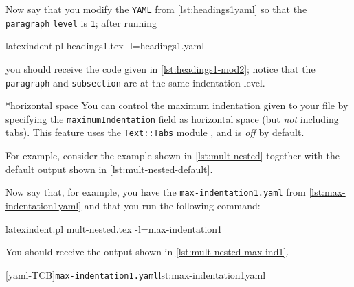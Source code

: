  Now say that you modify the \texttt{YAML} from \cref{lst:headings1yaml} so that the
 \texttt{paragraph} \texttt{level} is \texttt{1}; after running 

 \begin{commandshell}
latexindent.pl headings1.tex -l=headings1.yaml
\end{commandshell}

 you should receive the code given in \cref{lst:headings1-mod2}; notice that the
 \texttt{paragraph} and \texttt{subsection} are at the same indentation level.


*{horizontal space}
 You can control the maximum indentation given to your file by
  specifying the \texttt{maximumIndentation}
 field as horizontal space (but \emph{not} including tabs). This feature uses the
 \texttt{Text::Tabs} module \cite{texttabs}, and is \emph{off} by default.%

 \begin{example}
 For example, consider the example shown in \cref{lst:mult-nested} together with the
 default output shown in \cref{lst:mult-nested-default}.

 \begin{cmhtcbraster}[raster column skip=.1\linewidth]
 \end{cmhtcbraster}
 \end{example}

 \begin{example}
 Now say that, for example, you have the \texttt{max-indentation1.yaml} from
 \cref{lst:max-indentation1yaml} and that you run the following command:

 \begin{commandshell}
latexindent.pl mult-nested.tex -l=max-indentation1
\end{commandshell}

 You should receive the output shown in \cref{lst:mult-nested-max-ind1}.

 \begin{cmhtcbraster}
  [yaml-TCB]{\texttt{max-indentation1.yaml}}{lst:max-indentation1yaml}
 \end{cmhtcbraster}
 \end{example}

